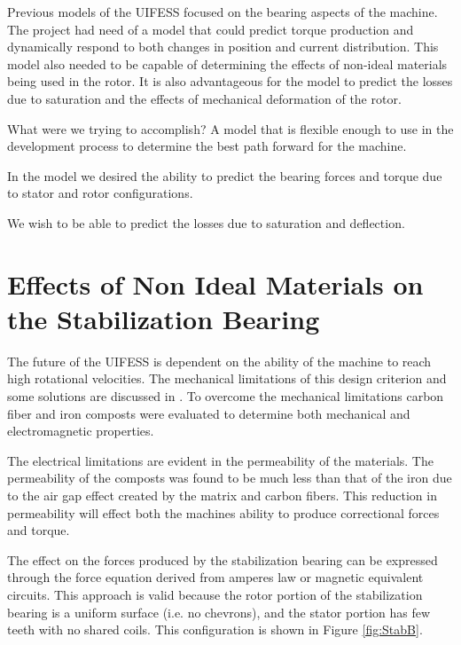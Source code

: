 
\onehalfspacing

Previous models of the UIFESS focused on the bearing aspects of the machine. The project had need of a model that could predict torque production and dynamically respond to both changes in position and current distribution. This model also needed to be capable of determining the effects of non-ideal materials being used in the rotor. It is also advantageous for the model to predict the losses due to saturation and the effects of mechanical deformation of the rotor.


What were we trying to accomplish?
	A model that is flexible enough to use in the development process to determine the best path forward for the machine. 
	
	In the model we desired the ability to predict the bearing forces and torque due to stator and rotor configurations.
	
	We wish to be able to predict the losses due to saturation and deflection.
	
\section{Effects of Non Ideal Materials on the Stabilization Bearing}
The future of the UIFESS is dependent on the ability of the machine to reach high rotational velocities. The mechanical limitations of this design criterion and some solutions are discussed in \cite{Pettingill}.  To overcome the mechanical limitations carbon fiber and iron composts were evaluated to determine both mechanical and electromagnetic properties.

The electrical limitations are evident in the permeability of the materials. The permeability of the composts was found to be much less than that of the iron due to the air gap effect created by the matrix and carbon fibers. This reduction in permeability will effect both the machines ability to produce correctional forces and torque.

The effect on the forces produced by the stabilization bearing can be expressed through the force equation derived from amperes law or magnetic equivalent circuits. This approach is valid because the rotor portion of the stabilization bearing is a uniform surface (i.e. no chevrons), and the stator portion has few teeth with no shared coils. This configuration is shown in Figure \ref{fig:StabB}.

